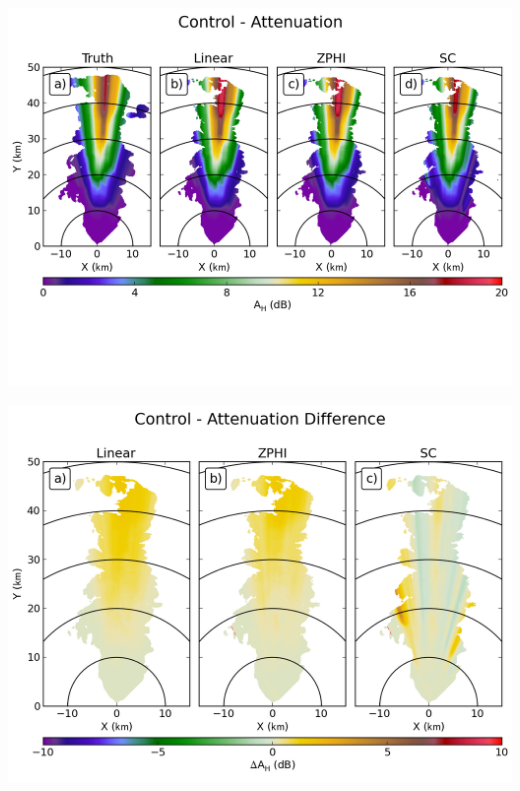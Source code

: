 \documentclass[red]{beamer}
\begin{document}
\begin{frame}
	\begin{center}
		\includegraphics[scale=0.55]{figures/C_Control_Attenuation.png}
	\end{center}
\end{frame}

\begin{frame}
	\begin{center}
		\includegraphics[scale=0.45]{figures/C_Control_Attenuation_Difference.png}
	\end{center}
\end{frame}
\end{document}
